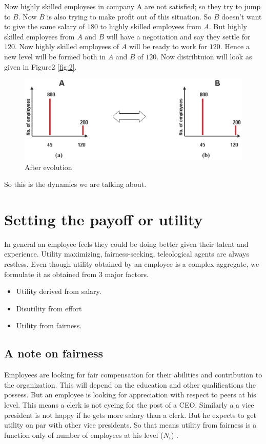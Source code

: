 \documentclass[letterpaper,english,10pt]{article}
\begin{document}
 Now highly skilled employees in company A are not satisfied; so they try to jump to $B$. Now $B$ is also trying to make profit out of this situation. So $B$ doesn't want to give the same salary of $180$  to highly skilled employees from $A$. But highly skilled employees from $A$ and $B$ will have a negotiation and say they settle for $120$. Now highly skilled employees of $A$ will be ready to work for $120$. Hence a new level will be formed both in $A$ and $B$ of $120$. Now distribtuion will look as given in Figure2 \ref{fig:2}.





\begin{figure}[h!] \label{fig3}
	\includegraphics[width=\linewidth]{dynamics3.png}
	\caption{After evolution}
	\label{fig:Earthatmo}
\end{figure}

So this is the dynamics we are talking about.


\section{Setting the payoff or utility}
In general an employee feels they could be doing better given their talent and experience. Utility maximizing, fairness-seeking, teleological agents are always restless. Even though utility obtained by an employee is a complex aggregate, we formulate it as obtained from 3 major factors. 
\begin{itemize}
    \item Utility derived from salary.
    \item Disutility from effort
    \item Utility from fairness.
    
\end{itemize}
\subsection{A note on fairness}
Employees are looking for fair compensation for their abilities and contribution to the organization. This will depend on the education and other qualifications the possess. But an employee is looking for appreciation with respect to peers at his level. This means a clerk is not eyeing for the post of a CEO. Similarly a a vice president is not happy if he gets more salary than a clerk. But he expects to get utility on par with other vice presidents. So that means utility from fairness is a function only of number of employees at his level ($N_i$) . 
\end{document}
